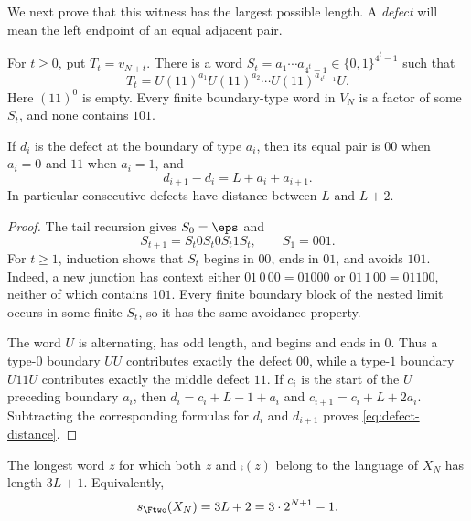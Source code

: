 We next prove that this witness has the largest possible length.  A
\emph{defect} will mean the left endpoint of an equal adjacent pair.

\begin{lemma}\label{lem:defect-coding}
For $t\geq0$, put $T_t=v_{N+t}$.  There is a word
$S_t=a_1\cdots a_{4^t-1}\in\{0,1\}^{4^t-1}$ such that
\begin{equation}\label{eq:base-tiling}
 T_t=U(11)^{a_1}U(11)^{a_2}\cdots U(11)^{a_{4^t-1}}U.
\end{equation}
Here $(11)^0$ is empty.  Every finite boundary-type word in $V_N$ is a
factor of some $S_t$, and none contains $101$.

If $d_i$ is the defect at the boundary of type $a_i$, then its equal pair is
$00$ when $a_i=0$ and $11$ when $a_i=1$, and
\begin{equation}\label{eq:defect-distance}
 d_{i+1}-d_i=L+a_i+a_{i+1}.
\end{equation}
In particular consecutive defects have distance between $L$ and $L+2$.
\end{lemma}

\begin{proof}
The tail recursion gives $S_0=\eps$ and
\begin{equation}\label{eq:spacer-recursion}
 S_{t+1}=S_t0S_t0S_t1S_t,
 \qquad S_1=001.
\end{equation}
For $t\geq1$, induction shows that $S_t$ begins in $00$, ends in $01$, and
avoids $101$.  Indeed, a new junction has context either
$01\,0\,00=01000$ or $01\,1\,00=01100$, neither of which contains $101$.
Every finite boundary block of the nested limit occurs in some finite
$S_t$, so it has the same avoidance property.

The word $U$ is alternating, has odd length, and begins and ends in $0$.
Thus a type-$0$ boundary $UU$ contributes exactly the defect $00$, while a
type-$1$ boundary $U11U$ contributes exactly the middle defect $11$.
If $c_i$ is the start of the $U$ preceding boundary $a_i$, then
$d_i=c_i+L-1+a_i$ and $c_{i+1}=c_i+L+2a_i$.  Subtracting the corresponding
formulas for $d_i$ and $d_{i+1}$ proves \eqref{eq:defect-distance}.
\end{proof}

\begin{proposition}\label{prop:exact-separation}
The longest word $z$ for which both $z$ and $\comp(z)$ belong to the language
of $X_N$ has length $3L+1$.  Equivalently,
\begin{equation}\label{eq:exact-separation}
 s_{\Ftwo}(X_N)=3L+2=3\cdot2^{N+1}-1.
\end{equation}
\end{proposition}

